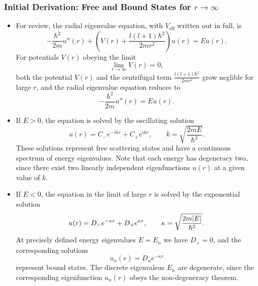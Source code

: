 \documentclass[11pt, a4paper]{article}
\begin{document}
\subsubsection{Initial Derivation: Free and Bound States for $ r \to \infty $}
\begin{itemize}

    \item For review, the radial eigenvalue equation, with $ V_{\text{eff}} $ written out in full, is
    \begin{equation*}
        - \frac{\hbar^{2}}{2m}u''(r) + \left( V(r) + \frac{l (l+1)\hbar^{2}}{2mr^{2}} \right)u(r) = E u(r).
    \end{equation*}
	For potentials $ V(r) $ obeying the limit
	\begin{equation*}
		\lim_{r \to \infty} V(r) = 0,
	\end{equation*}
    both the potential $ V(r) $ and the centrifugal term $ \frac{l (l+1)\hbar^{2}}{2mr^{2}} $ grow neglible for large $ r $, and the radial eigenvalue equation reduces to
	\begin{equation*}
		- \frac{\hbar^{2}}{2m}u''(r) = Eu(r).
	\end{equation*}

    \item If $ E > 0 $, the equation is solved by the oscillating solution 
	\begin{equation*}
		u(r) = C_{-}e^{-i k r} + C_{+}e^{i k r}, \qquad k = \sqrt{\frac{2mE}{\hbar^{2}}}.
	\end{equation*}
    These solutions represent free scattering states and have a continuous spectrum of energy eigenvalues. Note that each energy has degeneracy two, since there exist two linearly independent eigenfunctions $ u(r) $ at a given value of $ k $. 

    \item If $ E < 0 $, the equation in the limit of large $ r $ is solved by the exponential solution
	\begin{equation*}
        u(r) = D_{-}e^{-\kappa r} + D_{+}e^{\kappa r}, \qquad \kappa = \sqrt{\frac{2m\abs{E}}{\hbar^{2}}}.
	\end{equation*}
	At precisely defined energy eigenvalues $ E = E_{n} $ we have $ D_{+} = 0 $, and the corresponding solutions
	\begin{equation*}
		u_{n}(r) = D_{n}e^{-\kappa r}
	\end{equation*}
    represent bound states. The discrete eigenvaleus $ E_{n} $ are degenerate, since the corresponding eigenfunction $ u_{n}(r) $ obeys the non-degeneracy theorem.
	
\end{itemize}
\end{document}
